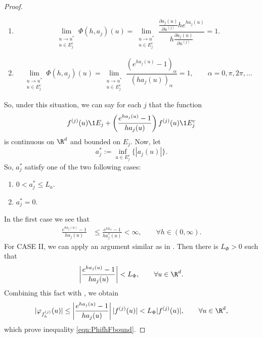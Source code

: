 \begin{proof}
	\begin{enumerate}[C{A}SE I:]
		\item
			\begin{equation}\label{eqn:ajSingularityCasei}
				\lim_{
					\substack{
						u \to u^*\\ 
						u\in E_j^c
					}
				}
				\Phi(h,a_j)(u) =
				\lim_{
					\substack{
						u \to u^*\\ 
						u\in E_j^c
					}
				}	
				\frac{\frac{\partial a_j(u)}{\partial u^{(j)}} 
					h e^{h a_j(u)} 
				}{
					h\frac{\partial a_j(u)}{\partial u^{(j)}}
				}=1.
			\end{equation}	
		\item
			\begin{equation}\label{eqn:ajSingularityCaseii}
			\lim_{
				\substack{
					u \to u^*\\ 
					u\in E_j^c
				}
			}
			\Phi(h,a_j)(u) 
			=
			\lim_{
				\substack{
					u \to u^*\\ 
					u\in E_j^c
				}
			}	
			\frac{
				\left(
					 e^{h a_j(u)} - 1
				 \right)_{\alpha}
			}{
				\left(
					h a_j(u)
				\right)_{\alpha}
			}	=	1, \qquad \alpha = 0,\pi, 2\pi,\dots
		\end{equation}	
	\end{enumerate}
	So, under this situation, we can say for each $j$ that the function
	\begin{equation*}
		f^{(j)}(u) \1{E_j} +
		\left(
			\frac{e^{ha_j(u)}-1}{ha_j(u)}
		\right)
		f^{(j)}(u) \1{E_j^c}
	\end{equation*}
	is continuous on $\R^d$ and bounded on $E_j$.
	Now, let
		$$
			a^*_j:= \inf_{u\in E_j^c}
			\{
				|a_j(u)|
			\}.
		$$
	So, $a^*_j$ satisfy one of the two following cases:
	\begin{enumerate}[C{A}SE I:]
		\item
			$
				\displaystyle
				0 < a_j^*\leq L_a. 
			$
		\item
			$a_j^*=0$.
	\end{enumerate}
	In the first case we see that
	\begin{align*}
		\frac{e^{h a_j(u)}-1}{ha_j(u)}
		& \leq
			\frac{e^{h L_a}-1}{ha^*_j(u)} <\infty,
		\qquad \forall h\in (0,\infty ).
	\end{align*}
	For CASE II, we can apply an argument similar as in .
	Then there is  $L_{\Phi}>0$ such that
	\begin{equation}\label{eqn:PhiBound}
		\left|
			\frac{e^{ha_j(u)}-1}{ha_j(u)}
		\right| < L_{\Phi},
		\qquad \forall u \in \R^d.
	\end{equation}	
%		
	Combining this fact with , we obtain
	$$
		|\varphi_{f_h^{(j)}}(u)|
		\leq
		\left|
			\frac{e^{ha_j(u)}-1}{ha_j(u)}
		\right||f^{(j)}(u)| < L_{\Phi} |f^{(j)}(u)|,
		\qquad \forall u \in \R^d,
	$$
	which prove inequality \eqref{eqn:PhifhFbound}.
	

\end{proof}
